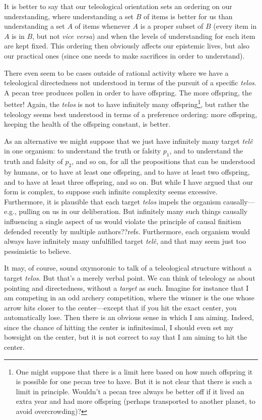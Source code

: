 It is better to say that our teleological orientation sets an ordering on our understanding, where understanding a set
$B$ of items is better for us than understanding a set $A$ of items whenever $A$ is a proper subset of $B$ (every item in $A$ is
in $B$, but not \textit{vice versa}) and when the levels of understanding for each item are kept fixed. This ordering then obviously
affects our epistemic lives, but also our practical ones (since one needs to make sacrifices in order to understand).

There even seem to be cases outside of rational activity where we have a teleological directedness not understood in terms of the pursuit of a specific \textit{telos}. 
A pecan tree produces pollen in order to have offspring. The more offspring, the better! Again, the 
\textit{telos} is not to have infinitely many offspring\footnote{One might suppose that there is a limit here based on how much offspring
it is possible for one pecan tree to have. But it is not clear that there is such a limit in principle. Wouldn't a pecan tree always be better
off if it lived an extra year and had more offspring (perhaps transported to another planet, to avoid overcrowding)?}, but rather the teleology
seems best understood in terms of a preference ordering: more offspring, keeping the health of the offspring constant, is better.

As an alternative we might suppose that we just have infinitely many target \textit{tel\^e} in one organism: to understand the truth or falsity $p_1$, 
and to understand the truth and falsity of $p_2$, and so on, for all the propositions that can be understood by humans, or to have
at least one offspring, and to have at least two offspring, and to have at least three offspring, and so on. But while I have argued that our form is 
complex, to suppose such infinite complexity seems excessive. Furthermore, it is plausible that each target \textit{telos} impels the organism
causally---e.g., pulling on us in our deliberation. But infinitely many such things causally influencing a single aspect of us would violate 
the principle of causal finitism defended recently by multiple authors??refs. Furthermore, each organism would always have infinitely 
many unfulfilled target \textit{tel\^e}, and that may seem just too pessimistic to believe.

It may, of course, sound oxymoronic to talk of a teleological structure without a target \textit{telos}. But that's a merely verbal point. We can
think of teleology as about pointing and directedness, without a \textit{target} as such. Imagine for instance that I am competing in an 
odd archery competition, where the winner is the one whose arrow hits closer to the center---except that if you hit the exact center, you
automatically lose. Then there is an obvious sense in which I am aiming. Indeed, since the chance of hitting the center is infinitesimal,
I should even set my bowsight on the center, but it is not correct to say that I am aiming to hit the center. 

